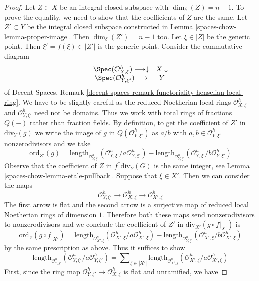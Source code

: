 \begin{proof}
\medskip\noindent
Let $Z \subset X$ be an integral closed subspace with $\dim_\delta(Z) = n - 1$.
To prove the equality, we need to show that the coefficients
of $Z$ are the same. Let $Z' \subset Y$ be the integral closed
subspace constructed in Lemma \ref{spaces-chow-lemma-proper-image}.
Then $\dim_\delta(Z') = n - 1$ too. Let $\xi \in |Z|$ be the generic point.
Then $\xi' = f(\xi) \in |Z'|$ is the generic point.
Consider the commutative diagram
$$
\begin{array}{cc}\Spec(\mathcal{O}_{X, \xi}^h) \longrightarrow\downarrow & X \downarrow \\ \Spec(\mathcal{O}_{Y, \xi'}^h) \longrightarrow & Y\end{array}
$$
of Decent Spaces, Remark
\ref{decent-spaces-remark-functoriality-henselian-local-ring}.
We have to be slightly careful as the reduced Noetherian local rings
$\mathcal{O}_{X, \xi}^h$ and $\mathcal{O}_{Y, \xi'}^h$ need not be domains.
Thus we work with total rings of fractions $Q(-)$ rather than fraction fields.
By definition, to get the coefficient of $Z'$ in $\text{div}_Y(g)$
we write the image of $g$ in $Q(\mathcal{O}_{Y, \xi'}^h)$
as $a/b$ with $a, b \in \mathcal{O}_{Y, \xi'}^h$ nonzerodivisors
and we take
$$
\text{ord}_{Z'}(g) =
\text{length}_{\mathcal{O}_{Y, \xi'}^h}
(\mathcal{O}_{Y, \xi'}^h/a \mathcal{O}_{Y, \xi'}^h) -
\text{length}_{\mathcal{O}_{Y, \xi'}^h}
(\mathcal{O}_{Y, \xi'}^h/b \mathcal{O}_{Y, \xi'}^h)
$$
Observe that the coefficient of $Z$ in $f^*\text{div}_Y(G)$
is the same integer, see Lemma \ref{spaces-chow-lemma-etale-pullback}.
Suppose that $\xi \in X'$. Then we can consider the maps
$$
\mathcal{O}_{Y, \xi'}^h \to
\mathcal{O}_{X, \xi}^h \to
\mathcal{O}_{X', \xi}^h
$$
The first arrow is flat and the second arrow is a surjective
map of reduced local Noetherian rings of dimension $1$.
Therefore both these maps send nonzerodivisors to nonzerodivisors
and we conclude the coefficient of $Z'$ in $\text{div}_{X'}(g \circ f|_{X'})$
is
$$
\text{ord}_Z(g \circ f|_{X'}) =
\text{length}_{\mathcal{O}_{X', \xi}^h}
(\mathcal{O}_{X', \xi}^h/a \mathcal{O}_{X', \xi}^h) -
\text{length}_{\mathcal{O}_{Y, \xi'}^h}
(\mathcal{O}_{X', \xi}^h/b \mathcal{O}_{X', \xi}^h)
$$
by the same prescription as above. Thus it suffices to show
$$
\text{length}_{\mathcal{O}_{Y, \xi'}^h}
(\mathcal{O}_{Y, \xi'}^h/a \mathcal{O}_{Y, \xi'}^h) =
\sum\nolimits_{\xi \in |X'|}
\text{length}_{\mathcal{O}_{X', \xi}^h}
(\mathcal{O}_{X', \xi}^h/a \mathcal{O}_{X', \xi}^h)
$$
First, since the ring map $\mathcal{O}_{Y, \xi'}^h \to
\mathcal{O}_{X, \xi}^h$ is flat and unramified, we have

\end{proof}
